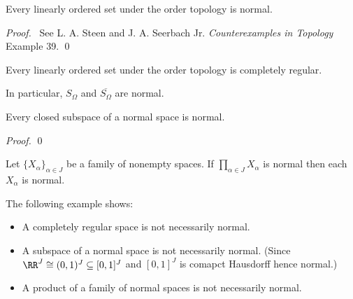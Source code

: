 \begin{theorem}
    Every linearly ordered set under the order topology is normal.
\end{theorem}

\begin{proof}
    \pf\ See L. A. Steen and J. A. Seerbach Jr. \emph{Counterexamples in
    Topology} Example 39. \qed
\end{proof}

\begin{corollary}
    \label{corollary:order_topology_completely_regular}
    Every linearly ordered set under the order topology is completely regular.
\end{corollary}

\begin{example}
    In particular, $S_\Omega$ and $\overline{S_\Omega}$ are normal.
\end{example}

\begin{proposition}
    \label{proposition:closed_subspace_normal}
    Every closed subspace of a normal space is normal.
\end{proposition}

\begin{proof}
    \pf
    \qed
\end{proof}

\begin{corollary}
    Let $\{ X_\alpha \}_{\alpha \in J}$ be a family of nonempty spaces. If
    $\prod_{\alpha \in J} X_\alpha$ is normal then each $X_\alpha$ is normal.
\end{corollary}

The following example shows:
\begin{itemize}
    \item A completely regular space is not necessarily normal.
    \item A subspace of a normal space is not necessarily normal.
    (Since $\RR^J \cong (0,1)^J \subseteq [0,1]^J$ and $[0,1]^J$
    is comapct Hausdorff hence normal.)
    \item A product of a family of normal spaces is not necessarily normal.
\end{itemize}

